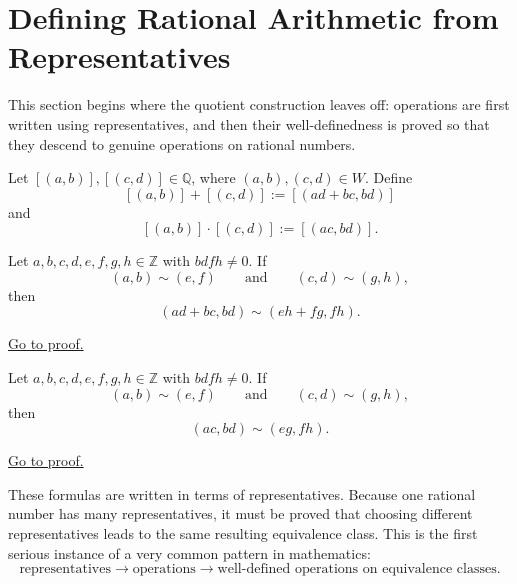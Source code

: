 
\section{Defining Rational Arithmetic from Representatives}
\label{sec:rational-arithmetic-from-representatives}

\begin{exposition}
This section begins where the quotient construction leaves off: operations are first written using representatives, and then their well-definedness is proved so that they descend to genuine operations on rational numbers.
\end{exposition}

\begin{definition}
\label{def:rational-operations}

Let $[(a,b)],[(c,d)]\in\mathbb{Q}$, where $(a,b),(c,d)\in W$.  Define
\[
[(a,b)] + [(c,d)] := [(ad+bc,bd)]
\]
and
\[
[(a,b)]\cdot[(c,d)] := [(ac,bd)].
\]

\end{definition}

\begin{lemma}
\label{lem:rational-addition-well-defined}
Let $a,b,c,d,e,f,g,h\in\mathbb{Z}$ with $bdfh\neq 0$. If
\[
(a,b)\sim(e,f)
\qquad\text{and}\qquad
(c,d)\sim(g,h),
\]
then
\[
(ad+bc,bd)\sim(eh+fg,fh).
\]
\end{lemma}

\begin{remark*}[Proof]
\hyperref[prf:rational-addition-well-defined]{Go to proof.}
\end{remark*}

\begin{lemma}
\label{lem:rational-multiplication-well-defined}
Let $a,b,c,d,e,f,g,h\in\mathbb{Z}$ with $bdfh\neq 0$. If
\[
(a,b)\sim(e,f)
\qquad\text{and}\qquad
(c,d)\sim(g,h),
\]
then
\[
(ac,bd)\sim(eg,fh).
\]
\end{lemma}

\begin{remark*}[Proof]
\hyperref[prf:rational-multiplication-well-defined]{Go to proof.}
\end{remark*}

\begin{remark*}
\label{rem:well-definedness-matters}

These formulas are written in terms of representatives.  Because one rational number has many
representatives, it must be proved that choosing different representatives leads to the same
resulting equivalence class.  This is the first serious instance of a very common pattern in
mathematics:
\[
\text{representatives}
\longrightarrow
\text{operations}
\longrightarrow
\text{well-defined operations on equivalence classes}.
\]

\end{remark*}

